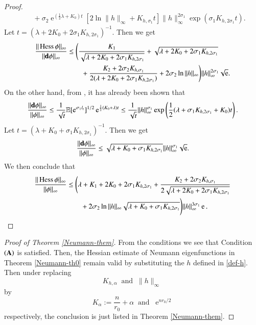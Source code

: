 \documentclass[11pt,reqno]{amsart}
\theoremstyle{definition} \newtheorem{remark}[theorem]{Remark}
\numberwithin{equation}{section}
\newcommand\1{\mathbbm{1}}
\def\bd{{\bf d}}
\def\r{\right}
\def\l{\left} \def\e{\operatorname{e}} \def\dsum{\displaystyle\sum}
\begin{document}
\begin{proof}
\begin{align*}
&\quad +\sigma_2\e^{(\frac12\lambda+K_0)t}\l[2 \ln \|h\|_{\infty}+K_{h,\sigma_1}t\r]\|h\|_{\infty}^{2\sigma_1 }\exp \l(\sigma_1K_{h,2\sigma_1} t\r).
\end{align*}
Let $t=\l(\lambda+2K_0+2\sigma_1K_{h,2\sigma_1 }\r)^{-1}$. Then we get
\begin{align*}
\frac{\|\Hess \phi\|_{\infty}}{\|\bd \phi\|_{\infty}} &\leq  \Bigg(\frac{K_1}{\sqrt{\lambda+2K_0+2\sigma_1K_{h,2\sigma_1}}}+\sqrt{\lambda+2K_0+2\sigma_1K_{h,2\sigma_1}}\\
&\qquad +\frac{K_2+2\sigma_2K_{h,\sigma_1}}{2(\lambda+2K_0+2\sigma_1K_{h,2\sigma_1 })}+2\sigma_2\ln\|h\|_{\infty} \Bigg)\|h\|_{\infty}^{2\sigma_1} \sqrt{ \e}.
\end{align*}
On the other hand,  from \cite{ATW}, it has already been shown that
\begin{align*}
\frac{\|\bd \phi \|_{\infty}}{\|\phi\|_{\infty}}\leq \frac{1}{\sqrt{t}}\E[\e^{\sigma_1 l_t}]^{1/2}\e^{\frac{1}{2}(K_0+\lambda)t}\leq  \frac{1}{\sqrt{t}}\|h\|_{\infty}^{\sigma_1 }\exp \l(\frac{1}{2}(\lambda+\sigma_1K_{h,2\sigma_1 } +K_0)t\r).
\end{align*}
Let $t=\l(\lambda+K_0+\sigma_1K_{h,2\sigma_1 }\r)^{-1}$. Then we get
\begin{align*}
\frac{\|\bd \phi \|_{\infty}}{\|\phi\|_{\infty}}\leq \sqrt{\lambda+K_0+\sigma_1K_{h,2\sigma_1 }} \|h\|_{\infty}^{\sigma_1} \sqrt{\e}.
\end{align*}
We then conclude that 
\begin{align*}
\frac{\|\Hess \phi\|_{\infty}}{\|\phi\|_{\infty}}& \leq  \Bigg(\lambda+K_1+2K_0+2\sigma_1K_{h,2\sigma_1} +\frac{K_2+2\sigma_2K_{h,\sigma_1}}{2\sqrt{\lambda+2K_0+2\sigma_1K_{h,2\sigma_1 }}}\\
&\qquad+2\sigma_2\ln\|h\|_{\infty}\sqrt{\lambda+K_0+\sigma_1K_{h,2\sigma_1 }} \Bigg)\|h\|_{\infty}^{3\sigma_1} \e.
\end{align*}


\end{proof}

\begin{proof}[Proof of Theorem \ref{Neumann-them}]
From the conditions we see that  Condition ${\bf (A)}$ is satisfied.
Then, the Hessian estimate of Neumann eigenfunctions in Theorem \ref{Neumann-th0}  remain valid by substituting the $h$ defined in \eqref{def-h}. Then  under replacing
$$ K_{h,\alpha}\ \mbox{ and }\ \|h\|_{\infty}\ $$
by
$$ {K}_{\alpha}:=\frac{n}{r_0}+\alpha\ \mbox{ and } \ \e^{n r_0/2}$$
respectively, the conclusion is just listed in Theorem \ref{Neumann-them}.
\end{proof}
\end{document}

